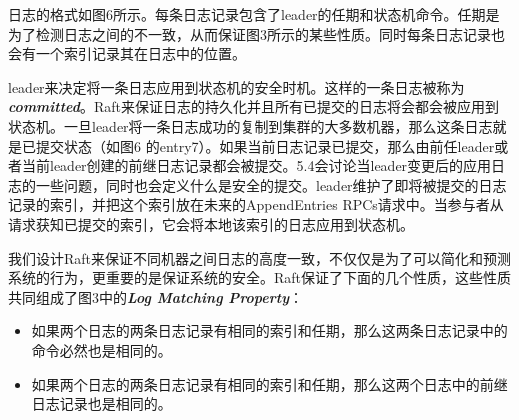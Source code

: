 \documentclass[journal]{IEEEtran}
\begin{document}
日志的格式如图6所示。每条日志记录包含了leader的任期和状态机命令。任期是为了检测日志之间的不一致，从而保证图3所示的某些性质。同时每条日志记录也会有一个索引记录其在日志中的位置。

leader来决定将一条日志应用到状态机的安全时机。这样的一条日志被称为\textbf{\textit{committed}}。Raft来保证日志的持久化并且所有已提交的日志将会都会被应用到状态机。一旦leader将一条日志成功的复制到集群的大多数机器，那么这条日志就是已提交状态（如图6 的entry7）。如果当前日志记录已提交，那么由前任leader或者当前leader创建的前继日志记录都会被提交。5.4会讨论当leader变更后的应用日志的一些问题，同时也会定义什么是安全的提交。leader维护了即将被提交的日志记录的索引，并把这个索引放在未来的AppendEntries RPCs请求中。当参与者从请求获知已提交的索引，它会将本地该索引的日志应用到状态机。

我们设计Raft来保证不同机器之间日志的高度一致，不仅仅是为了可以简化和预测系统的行为，更重要的是保证系统的安全。Raft保证了下面的几个性质，这些性质共同组成了图3中的\textbf{\textit{Log Matching Property}}：
\begin{itemize}
\item 如果两个日志的两条日志记录有相同的索引和任期，那么这两条日志记录中的命令必然也是相同的。
\item 如果两个日志的两条日志记录有相同的索引和任期，那么这两个日志中的前继日志记录也是相同的。
\end{itemize}
\end{document}
